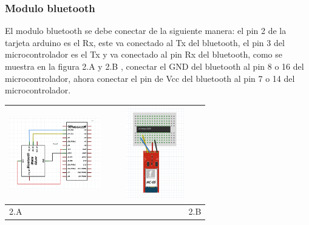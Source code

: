 \documentclass[12]{article}
\newenvironment{Figure}
{\par\medskip\noindent\minipage{\linewidth}}
{\endminipage\par\medskip}
\begin{document}
\begin{multicols}{2}
\subsubsection{Modulo bluetooth}
El modulo bluetooth se debe conectar de la siguiente manera: el pin 2 de la tarjeta arduino es el Rx, este va conectado al Tx del bluetooth, el pin 3 del microcontrolador es el Tx y va conectado al pin Rx del bluetooth, como se muestra en la figura 2.A y 2.B , conectar el GND del bluetooth al pin 8  o 16 del microcontrolador, ahora conectar el pin de Vcc del bluetooth al pin 7 o 14 del microcontrolador.
\begin{Figure}
\center
\begin{tabular}{|l|r|}
\hline
\includegraphics[width=4cm, height=4cm]{img/bluetoothesq.png} & \includegraphics[width=4cm, height=4cm]{img/bluetoothmon.png} \\ \hline
2.A & 2.B \\ \hline
\end{tabular}
\label{fig:g2}
\end{Figure}

\end{multicols}
\end{document}
